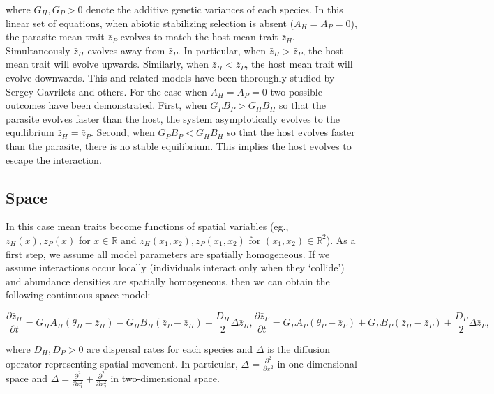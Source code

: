 \documentclass{article}
\begin{document}
where \(G_H,G_P>0\) denote the additive genetic variances of each
species. In this linear set of equations, when abiotic stabilizing
selection is absent (\(A_H=A_P=0\)), the parasite mean trait
\(\bar z_P\) evolves to match the host mean trait \(\bar z_H\).
Simultaneously \(\bar z_H\) evolves away from \(\bar z_P\). In
particular, when \(\bar z_H>\bar z_P\), the host mean trait will evolve
upwards. Similarly, when \(\bar z_H<\bar z_P\), the host mean trait will
evolve downwards. This and related models have been thoroughly studied
by Sergey Gavrilets and others. For the case when \(A_H=A_P=0\) two
possible outcomes have been demonstrated. First, when \(G_PB_P>G_HB_H\)
so that the parasite evolves faster than the host, the system
asymptotically evolves to the equilibrium \(\bar z_H=\bar z_P\). Second,
when \(G_PB_P<G_HB_H\) so that the host evolves faster than the
parasite, there is no stable equilibrium. This implies the host evolves
to escape the interaction.

\hypertarget{space}{%
\subsection{Space}\label{space}}

In this case mean traits become functions of spatial variables (eg.,
\(\bar z_H(x),\bar z_P(x)\) for \(x\in\mathbb R\) and
\(\bar z_H(x_1,x_2),\bar z_P(x_1,x_2)\) for
\((x_1,x_2)\in\mathbb R^2\)). As a first step, we assume all model
parameters are spatially homogeneous. If we assume interactions occur
locally (individuals interact only when they `collide') and abundance
densities are spatially homogeneous, then we can obtain the following
continuous space model:

\begin{subequations}
  \begin{equation}
    \frac{\partial\bar z_H}{\partial t}=G_HA_H(\theta_H-\bar z_H)-G_HB_H(\bar z_P-\bar z_H)+\frac{D_H}{2}\Delta\bar z_H,
  \end{equation}
  \begin{equation}
    \frac{\partial\bar z_P}{\partial t}=G_PA_P(\theta_P-\bar z_P)+G_PB_P(\bar z_H-\bar z_P)+\frac{D_P}{2}\Delta\bar z_P,
  \end{equation}
\end{subequations}

where \(D_H,D_P>0\) are dispersal rates for each species and \(\Delta\)
is the diffusion operator representing spatial movement. In particular,
\(\Delta=\frac{\partial^2}{\partial x^2}\) in one-dimensional space and
\(\Delta=\frac{\partial^2}{\partial x_1^2}+\frac{\partial^2}{\partial x_2^2}\)
in two-dimensional space.
\end{document}
